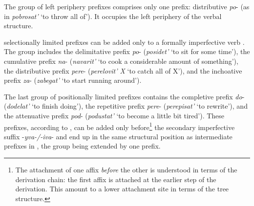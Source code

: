 The group of left periphery prefixes  comprises only one prefix: distributive  \textit{po}- (as in \textit{pobrosat'} `to throw all of'). It occupies the left periphery  of the verbal structure.

selectionally limited prefixes  can be added only to a formally imperfective verb . The group includes the delimitative  prefix \textit{po}- (\textit{posidet'} `to sit for some time'), the cumulative  prefix \textit{na}- (\textit{navarit'} `to cook a considerable amount of something'), the distributive  prefix \textit{pere}- (\textit{perelovit' X} `to catch all of X'), and the inchoative  prefix \textit{za}- (\textit{zabegat'} `to start running around').

The last group of positionally limited prefixes  contains the completive  prefix \textit{do}- (\textit{dodelat'} `to finish doing'), the repetitive  prefix \textit{pere}- (\textit{perepisat'} `to rewrite'), and the attenuative  prefix \textit{pod}- (\textit{podustat'} `to become a little bit tired'). These prefixes, according to \citet{Tatevosov:09}, can be added only before\footnote{The attachment of one affix \textit{before} the other is understood in terms of the derivation chain: the first affix is attached at the earlier step of the derivation. This amount to a lower attachment site in terms of the tree structure.} the secondary imperfective  suffix -\textit{yva-/-iva}- and end up in the same structural position as intermediate prefixes  in \citet{Tatevosov:07}, the group being extended by one prefix.
	
